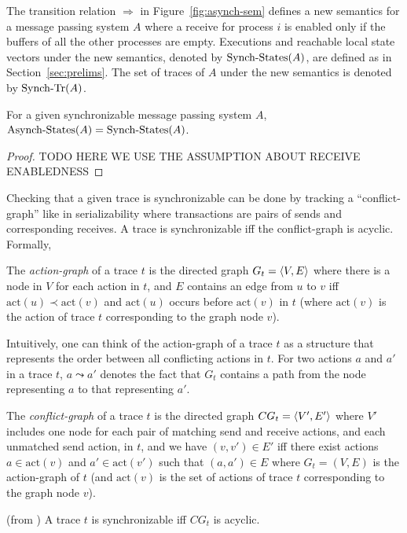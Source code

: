 The transition relation $\Rightarrow$ in Figure~\ref{fig:asynch-sem} defines a new semantics for  a message passing system $A$
where a receive for process $i$ is enabled only if the buffers of all the other processes are empty. Executions and reachable local
state vectors under the new semantics, denoted by $\mathrm{Synch}\text{-}\mathrm{States}(A)$, are defined as in Section~\ref{sec:prelims}.
The set of traces of $A$ under the new semantics is denoted by $\mathrm{Synch}\text{-}\mathrm{Tr}(A)$.

\begin{lemma}
For a given synchronizable message passing system $A$, $\mathrm{Asynch}\text{-}\mathrm{States}(A)=\mathrm{Synch}\text{-}\mathrm{States}(A)$.
\end{lemma}
\begin{proof}
TODO HERE WE USE THE ASSUMPTION ABOUT RECEIVE ENABLEDNESS
\end{proof}

Checking that a given trace is synchronizable can be done by tracking a ``conflict-graph'' like in serializability 
where transactions are pairs of sends and corresponding receives. 
A trace is synchronizable if{f} the conflict-graph is acyclic. Formally,

\begin{definition}\label{def:pr_graphs}
    The \emph{action-graph} of a trace $t$ is the directed graph 
    $G_t = \left\langle {V,E} \right\rangle$ where there is a node in $V$ for each action in $t$, and $E$ 
    contains an edge from $u$ to $v$ iff $\mathrm{act}(u) \prec \mathrm{act}(v)$ and $\mathrm{act}(u)$ occurs before $\mathrm{act}(v)$ in $t$ (where $\mathrm{act}(v)$ is the action of trace $t$ corresponding to the graph node $v$).
\end{definition}
Intuitively, one can think of the action-graph of a trace $t$ as a structure that represents the order between all conflicting actions in $t$.
For two actions $a$ and $a'$ in a trace $t$, $a\leadsto a'$ denotes the fact that $G_t$ contains a path from the node representing $a$ to that representing $a'$.

\begin{definition}\label{def:conf_graph}
    The \emph{conflict-graph} of a trace $t$ is the directed graph $CG_t=\left\langle {V',E'} \right\rangle$ where $V'$ includes one node for each pair of matching send and receive actions, and each unmatched send action, in $t$, and we have $(v,v') \in E'$ iff there exist actions $a \in \mathrm{act}(v)$ and $a' \in \mathrm{act}(v')$ such that $(a,a') \in E$ where $G_t = (V,E)$ is the action-graph of $t$ (and $\mathrm{act}(v)$ is the set of actions of trace $t$ corresponding to the graph node $v$).
\end{definition}



\begin{theorem}\label{thm:cg} (from \citep{journals/jacm/Papadimitriou79b})
A trace $t$ is synchronizable if{f} $CG_t$ is acyclic.
\end{theorem}



